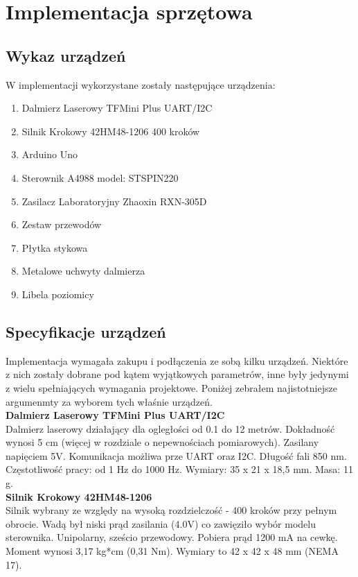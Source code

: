 \section {Implementacja sprzętowa}
\subsection {Wykaz urządzeń}

W implementacji wykorzystane zostały następujące urządzenia:

\begin{enumerate}
\item Dalmierz Laserowy TFMini Plus UART/I2C
\item Silnik Krokowy 42HM48-1206 400 kroków
\item Arduino Uno
\item Sterownik A4988 model: STSPIN220
\item Zasilacz Laboratoryjny Zhaoxin RXN-305D
\item Zestaw przewodów
\item Płytka stykowa
\item Metalowe uchwyty dalmierza
\item Libela poziomicy
\end{enumerate}

\subsection {Specyfikacje urządzeń}
Implementacja wymagała zakupu i podłączenia ze sobą kilku urządzeń. Niektóre z nich zostały dobrane pod kątem wyjątkowych parametrów, inne były jedynymi z wielu spełniających wymagania projektowe. Poniżej zebrałem najistotniejsze argumenmty za wyborem tych właśnie urządzeń.\\

\textbf{Dalmierz Laserowy TFMini Plus UART/I2C}\\
Dalmierz laserowy działający dla ogległości od 0.1 do 12 metrów. Dokładność wynosi 5 cm (więcej w rozdziale o nepewnościach pomiarowych). Zasilany napięciem 5V. Komunikacja możliwa prze UART oraz I2C. Długość fali 850 nm. Częstotliwość pracy: od 1 Hz do 1000 Hz. Wymiary: 35 x 21 x 18,5 mm. Masa: 11 g.\\

\textbf{Silnik Krokowy 42HM48-1206}\\
Silnik wybrany ze względy na wysoką rozdzielczość - 400 kroków przy pełnym obrocie. Wadą był niski prąd zasilania (4.0V) co zawięziło wybór modelu sterownika.  Unipolarny, sześcio przewodowy. Pobiera prąd 1200 mA na cewkę. Moment wynosi 3,17 kg*cm (0,31 Nm). Wymiary to 42 x 42 x 48 mm (NEMA 17).\\

